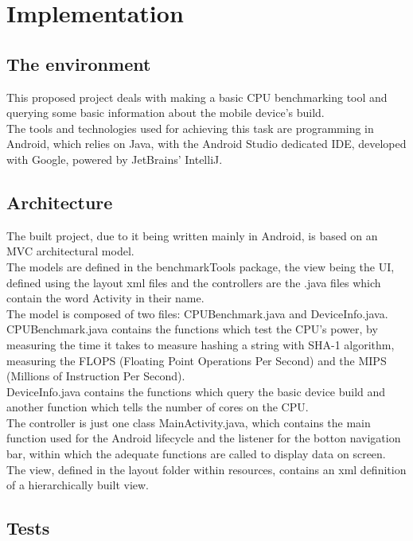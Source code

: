 \documentclass[a4paper,10pt]{report}
\begin{document}
\chapter{Implementation}
 \section{The environment}
 This proposed project deals with making a basic CPU benchmarking tool and querying some basic information about the mobile device's build.\\
 The tools and technologies used for achieving this task are programming in Android, which relies on Java, with the Android Studio dedicated IDE, developed with Google, powered by JetBrains' IntelliJ.\\
 
 \section{Architecture}
 The built project, due to it being written mainly in Android, is based on an MVC architectural model.\\
 The models are defined in the benchmarkTools package, the view being the UI, defined using the layout xml files and the controllers are the .java files which contain the word Activity in their name.\\
 The model is composed of two files: CPUBenchmark.java and DeviceInfo.java.\\
 CPUBenchmark.java contains the functions which test the CPU's power, by measuring the time it takes to measure hashing a string with SHA-1 algorithm, measuring the FLOPS (Floating Point Operations Per Second) and the MIPS (Millions of Instruction Per Second).\\
 DeviceInfo.java contains the functions which query the basic device build and another function which tells the number of cores on the CPU.\\
 The controller is just one class MainActivity.java, which contains the main function used for the Android lifecycle and the listener for the botton navigation bar, within which the adequate functions are called to display data on screen.\\
 The view, defined in the layout folder within resources, contains an xml definition of a hierarchically built view.\\
 
 \section{Tests}
\end{document}
